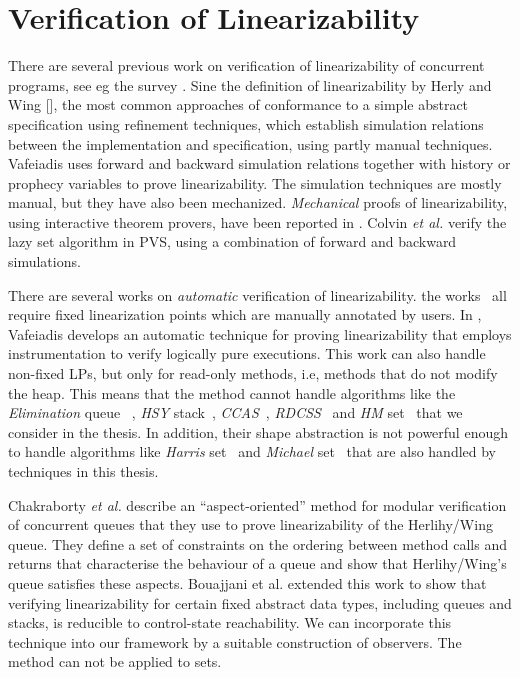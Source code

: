 \section{Verification of Linearizability}
There are several previous work on verification of linearizability of concurrent programs, see eg the survey \cite{Dongol} . Sine the definition of linearizability by Herly and Wing [], the most common approaches of conformance to a simple abstract specification using refinement techniques, which establish simulation relations between the implementation and specification, using partly manual techniques. Vafeiadis \cite{Vafeiadis:Thesis} uses forward and backward simulation relations together with history or prophecy variables to prove linearizability. The simulation techniques are mostly manual, but they have also been mechanized. {\it Mechanical} proofs of linearizability, using interactive theorem
provers, have been reported in 
\cite{Colvin:Lazy-List,Derrick:fm14,SWD:cav12,SDW:tcl14}.
Colvin {\it et al.} \cite{Colvin:Lazy-List}
verify the lazy set algorithm in  PVS,
using a combination of forward and backward simulations. 


There are several works on {\it automatic} verification of linearizability.
the works~\cite{AHHR:integrated,BLMRS:cav08,Vafeiadis:vmcai09}
all require fixed linearization points which are manually annotated by users.
In \cite{Vafeiadis:cav10}, Vafeiadis
develops an automatic technique for proving  linearizability that
employs instrumentation to verify logically pure executions.
This work can also handle non-fixed LPs, but only for read-only methods,
i.e, methods that do not modify the heap.
%
This means that the method cannot handle
 algorithms like the {\it Elimination} queue ~\cite{Shavit:ElimQueue}, {\it HSY} stack~\cite{HSYstack}, {\it CCAS}~\cite{Harris:CAS}, 
{\it RDCSS}~\cite{Harris:CAS} and {\it HM} set~\cite{ArtOfMpP} that we consider in the thesis. In addition, their shape abstraction is not powerful enough to handle algorithms like {\it Harris} set~\cite{Harris:list} and {\it Michael} set~\cite{Michael:list} that are also handled by techniques in this thesis.



Chakraborty {\it et al.} \cite{HSV:concur13}
describe an ``aspect-oriented'' method for  modular verification 
of concurrent queues that they use to prove linearizability of the Herlihy/Wing queue. They
define a set of constraints on the ordering between method calls and returns that characterise the behaviour of a queue and show that Herlihy/Wing’s queue satisfies these aspects.
Bouajjani et al. \cite{BEEH:icalp15} extended this work to show that verifying 
linearizability for certain
fixed abstract data types, including queues and stacks, is reducible to 
control-state reachability. 
%
We can incorporate this technique into
our framework by a suitable construction of observers.
The method can not be applied to sets.
%
  
